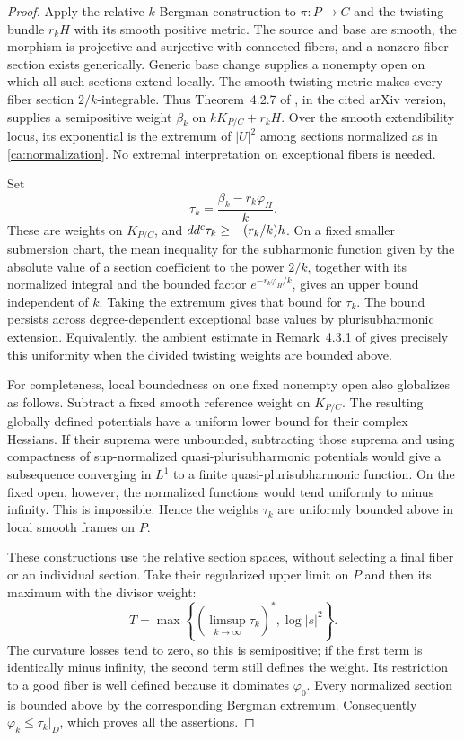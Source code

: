 \begin{proof}
Apply the relative \(k\)-Bergman construction to
\(\pi:P\to C\) and the twisting bundle \(r_kH\) with its smooth
positive metric.  The source and base are smooth, the morphism is
projective and surjective with connected fibers, and a nonzero
fiber section exists generically.  Generic base change supplies a
nonempty open on which all such sections extend locally.  The
smooth twisting metric makes every fiber section \(2/k\)-integrable.
Thus Theorem~4.2.7 of \cite{PaunTakayama18}, in the cited arXiv version, supplies
a semipositive weight \(\beta_k\) on \(kK_{P/C}+r_kH\).  Over the
smooth extendibility locus, its exponential is the extremum of
\(|U|^2\) among sections normalized as in
\eqref{ca:normalization}.  No extremal interpretation on exceptional
fibers is needed.

Set
\[
 \tau_k=\frac{\beta_k-r_k\varphi_H}{k}.
\]
These are weights on \(K_{P/C}\), and
\(dd^c\tau_k\geq-(r_k/k)h\).  On a fixed smaller submersion chart,
the mean inequality for the subharmonic function given by the
absolute value of a section coefficient to the power \(2/k\),
together with its normalized integral and the bounded factor
\(e^{-r_k\varphi_H/k}\), gives an upper bound independent of \(k\).
Taking the extremum gives that bound for \(\tau_k\).  The bound
persists across degree-dependent exceptional base values by
plurisubharmonic extension.  Equivalently, the ambient estimate in
Remark~4.3.1 of \cite{PaunTakayama18} gives precisely this uniformity when the
divided twisting weights are bounded above.

For completeness, local boundedness on one fixed nonempty open also
globalizes as follows.  Subtract a fixed smooth reference weight on
\(K_{P/C}\).  The resulting globally defined potentials have a
uniform lower bound for their complex Hessians.  If their suprema
were unbounded, subtracting those suprema and using compactness of
sup-normalized quasi-plurisubharmonic potentials would give a
subsequence converging in \(L^1\) to a finite quasi-plurisubharmonic
function.  On the fixed open, however, the normalized functions
would tend uniformly to minus infinity.  This is impossible.
Hence the weights \(\tau_k\) are uniformly bounded above in local
smooth frames on \(P\).

These constructions use the relative section spaces, without selecting
a final fiber or an individual section.  Take their regularized upper
limit on $P$ and then its maximum with the divisor weight:
\begin{equation}\label{ca:limiting-weight}
 T=\max\left\{\left(\limsup_{k\to\infty}\tau_k\right)^*,
                         \log|s|^2\right\}.
\end{equation}
The curvature losses tend to zero, so this is semipositive; if the
first term is identically minus infinity, the second term still
defines the weight.  Its restriction to a good fiber is well
defined because it dominates \(\varphi_0\).  Every normalized
section is bounded above by the corresponding Bergman extremum.
Consequently \(\varphi_k\leq\tau_k|_D\), which proves all the
assertions.
\end{proof}

